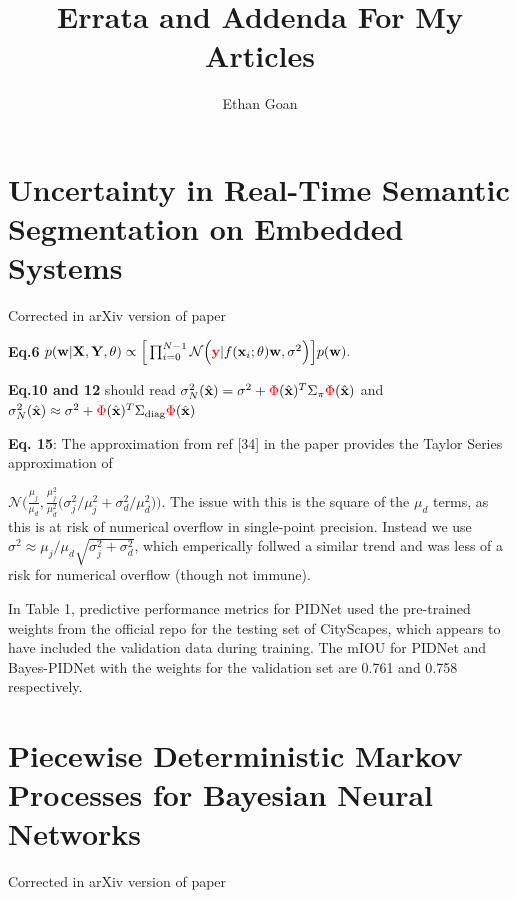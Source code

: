 \documentclass{article}
\title{{\titlefont Errata and Addenda For My Articles}}
\author{{\authorfont Ethan Goan}}
\begin{document}
\maketitle
\tableofcontents


\section{Uncertainty in Real-Time Semantic Segmentation on Embedded Systems}
Corrected in arXiv version of paper

\textbf{Eq.6}  $ p(\mathbf{w} | \mathbf{X}, \mathbf{Y} , \theta ) \propto \Big[\prod_{i=0}^{N-1}\mathcal{N}\Big({\color{red}\mathbf{y}}|f(\mathbf{x}_{i};\theta) \mathbf{w}, \sigma^{2}\Big)\Big] p(\mathbf{w}).$

\textbf{Eq.10 and 12} should read $\sigma^{2}_{N}(\hat{\mathbf{x}}) =
\sigma^{2} + {\color{red} \Phi}(\hat{\mathbf{x}})^{T}\Sigma_{\pi}{\color{red} \Phi}(\hat{\mathbf{x}})$ and
$\sigma^{2}_{N}(\hat{\mathbf{x}}) \approx \sigma^{2} +
{\color{red}\Phi}(\hat{\mathbf{x}})^{T}\Sigma_{\text{diag}}{\color{red}\Phi}(\hat{\mathbf{x}})$

\textbf{Eq. 15}: The approximation from ref [34] in the paper provides the Taylor Series approximation of

$ \mathcal{N}\Big(\frac{\mu_{j}}{\mu_{d}},\frac{\mu_{j}^{2}}{\mu_{d}^{2}}\big(\sigma^{2}_{j} / \mu_{j}^{2} +  \sigma^{2}_{d} / \mu_{d}^{2} \big)\Big)$. The issue with this is the square of the $\mu_{d}$ terms, as this is at risk of numerical overflow in single-point precision. Instead we use $\sigma^{2} \approx \mu_{j} / \mu_{d}\sqrt{\sigma^{2}_{j} + \sigma^{2}_{d}}$, which emperically follwed a similar trend and was less of a risk for numerical overflow (though not immune).

In Table 1, predictive performance metrics for PIDNet used the pre-trained weights from the official repo for the testing set of CityScapes, which appears to have included the validation data during training. The mIOU for PIDNet and Bayes-PIDNet with the weights for the validation set are 0.761 and 0.758 respectively.

\section{Piecewise Deterministic Markov Processes for Bayesian Neural Networks}
Corrected in arXiv version of paper
\end{document}
